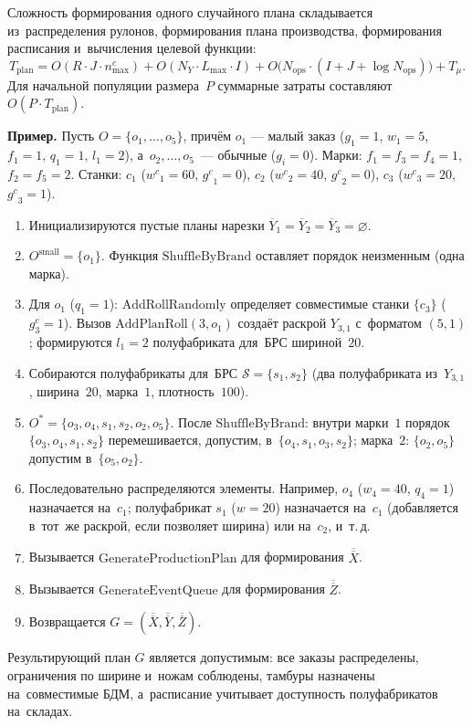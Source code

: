 Сложность формирования одного случайного плана складывается из~распределения рулонов, формирования плана производства, формирования расписания и~вычисления целевой функции:
\[
T_{\mathrm{plan}} = O(R\cdot J\cdot n^c_{\max}) + O(N_Y\cdot L_{\max}\cdot I) + O\bigl(N_{\mathrm{ops}}\cdot(I+J+\log N_{\mathrm{ops}})\bigr) + T_\mu.
\]
Для начальной популяции размера~$P$ суммарные затраты составляют $O(P\cdot T_{\mathrm{plan}})$.

\textbf{Пример.}
Пусть $O=\{o_1,\ldots,o_5\}$, причём $o_1$ --- малый заказ ($g_1=1$, $w_1=5$, $f_1=1$, $q_1=1$, $l_1=2$), а~$o_2,\ldots,o_5$~--- обычные ($g_i=0$).
Марки: $f_1=f_3=f_4=1$, $f_2=f_5=2$.
Станки: $c_1$ (${w^c}_1=60$, ${g^c}_1=0$), $c_2$ (${w^c}_2=40$, ${g^c}_2=0$), $c_3$ (${w^c}_3=20$, ${g^c}_3=1$).

\begin{enumerate}
\item Инициализируются пустые планы нарезки $\overline{Y}_1=\overline{Y}_2=\overline{Y}_3=\varnothing$.
\item $O^{\mathrm{small}}=\{o_1\}$. Функция $\mathrm{ShuffleByBrand}$ оставляет порядок неизменным (одна марка).
\item Для $o_1$ ($q_1=1$): $\mathrm{AddRollRandomly}$ определяет совместимые станки $\{c_3\}$ ($g^c_3=1$).
Вызов $\mathrm{AddPlanRoll}(3,o_1)$ создаёт раскрой $Y_{3,1}$ с~форматом $(5,1)$; формируются $l_1=2$ полуфабриката для~БРС шириной~$20$.
\item Собираются полуфабрикаты для~БРС $\mathcal{S}=\{s_1,s_2\}$ (два полуфабриката из~$Y_{3,1}$, ширина~$20$, марка~$1$, плотность~$100$).
\item $O^*=\{o_3,o_4,s_1,s_2,o_2,o_5\}$. После $\mathrm{ShuffleByBrand}$: внутри марки~$1$ порядок $\{o_3,o_4,s_1,s_2\}$ перемешивается, допустим, в~$\{o_4,s_1,o_3,s_2\}$; марка~$2$: $\{o_2,o_5\}$ допустим в~$\{o_5,o_2\}$.
\item Последовательно распределяются элементы. Например, $o_4$ ($w_4=40$, $q_4=1$) назначается на~$c_1$; полуфабрикат $s_1$ ($w=20$) назначается на~$c_1$ (добавляется в~тот~же раскрой, если позволяет ширина) или на~$c_2$, и~т.\,д.
\item Вызывается $\mathrm{GenerateProductionPlan}$ для формирования $\overline{\overline{X}}$.
\item Вызывается $\mathrm{GenerateEventQueue}$ для формирования $\overline{\overline{Z}}$.
\item Возвращается $G=(\overline{\overline{X}},\overline{\overline{Y}},\overline{\overline{Z}})$.
\end{enumerate}
Результирующий план $G$ является допустимым: все заказы распределены, ограничения по ширине и~ножам соблюдены, тамбуры назначены на~совместимые БДМ, а~расписание учитывает доступность полуфабрикатов на~складах.

